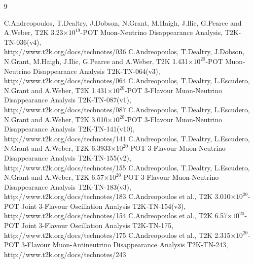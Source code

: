 %
%

\begin{thebibliography}{9}

%
%
   C.Andreopoulos, T.Dealtry, J.Dobson, N.Grant, M.Haigh, J.Ilic, G.Pearce and A.Weber,
   T2K 3.23$\times10^{19}$-POT Muon-Neutrino Disappearance Analysis,
   T2K-TN-036(v4),\\
   http://www.t2k.org/docs/technotes/036
   C.Andreopoulos, T.Dealtry, J.Dobson, N.Grant, M.Haigh, J.Ilic, G.Pearce and A.Weber,
   T2K 1.431$\times10^{20}$-POT Muon-Neutrino Disappearance Analysis
   T2K-TN-064(v3),\\
   http://www.t2k.org/docs/technotes/064
   C.Andreopoulos, T.Dealtry, L.Escudero, N.Grant and A.Weber,
   T2K 1.431$\times10^{20}$-POT 3-Flavour Muon-Neutrino Disappearance Analysis
   T2K-TN-087(v1),\\
   http://www.t2k.org/docs/technotes/087
   C.Andreopoulos, T.Dealtry, L.Escudero, N.Grant and A.Weber,
   T2K 3.010$\times10^{20}$-POT 3-Flavour Muon-Neutrino Disappearance Analysis
   T2K-TN-141(v10),\\
   http://www.t2k.org/docs/technotes/141
   C.Andreopoulos, T.Dealtry, L.Escudero, N.Grant and A.Weber,
   T2K 6.3933$\times10^{20}$-POT 3-Flavour Muon-Neutrino Disappearance Analysis
   T2K-TN-155(v2),\\
   http://www.t2k.org/docs/technotes/155
   C.Andreopoulos, T.Dealtry, L.Escudero, N.Grant and A.Weber,
   T2K 6.57$\times10^{20}$-POT 3-Flavour Muon-Neutrino Disappearance Analysis
   T2K-TN-183(v3),\\
   http://www.t2k.org/docs/technotes/183
   C.Andreopoulos et al.,
   T2K 3.010$\times10^{20}$-POT Joint 3-Flavour Oscillation Analysis
   T2K-TN-154(v3),\\
   http://www.t2k.org/docs/technotes/154
   C.Andreopoulos et al.,
   T2K 6.57$\times10^{20}$-POT Joint 3-Flavour Oscillation Analysis
   T2K-TN-175,\\
   http://www.t2k.org/docs/technotes/175
   C.Andreopoulos et al.,
   T2K 2.315$\times10^{20}$-POT 3-Flavour Muon-Antineutrino Disappearance Analysis
   T2K-TN-243,\\
   http://www.t2k.org/docs/technotes/243


\end{thebibliography}
